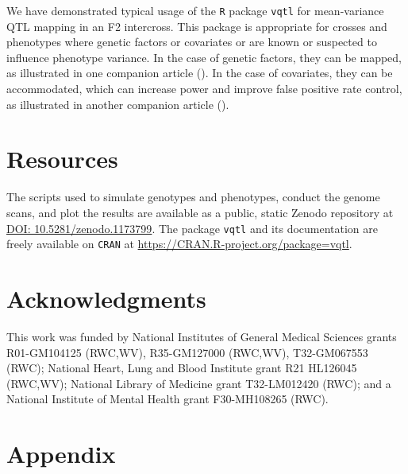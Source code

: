 \documentclass[9pt,twocolumn,twoside]{gsag3jnl}
\begin{document}
We have demonstrated typical usage of the \texttt{R} package \texttt{vqtl} for mean-variance QTL mapping in an F2 intercross.
This package is appropriate for crosses and phenotypes where genetic factors or covariates or are known or suspected to influence phenotype variance.
In the case of genetic factors, they can be mapped, as illustrated in one companion article (\CortyReanalysisPaper).
In the case of covariates, they can be accommodated, which can increase power and improve false positive rate control, as illustrated in another companion article (\CortyMethodsPaper).

\section*{Resources}
The scripts used to simulate genotypes and phenotypes, conduct the genome scans, and plot the results are available as a public, static Zenodo repository at \url{DOI: 10.5281/zenodo.1173799}.
The package \texttt{vqtl} and its documentation are freely available on \texttt{CRAN} at \url{https://CRAN.R-project.org/package=vqtl}.


\section{Acknowledgments}
This work was funded by National Institutes of General Medical Sciences grants R01-GM104125 (RWC,WV), R35-GM127000 (RWC,WV), T32-GM067553 (RWC); National Heart, Lung and Blood Institute grant R21 HL126045 (RWC,WV); National Library of Medicine grant T32-LM012420 (RWC); and a National Institute of Mental Health grant F30-MH108265 (RWC).




\clearpage
\newpage
\section*{Appendix}
\end{document}
